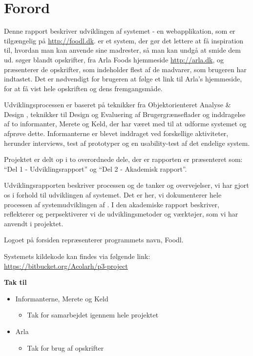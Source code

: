 \chapter*{Forord}
Denne rapport beskriver udviklingen af systemet \Foodl{} - en webapplikation, som er tilgængelig på \url{http://foodl.dk}. \Foodl{} er et system, der gør det lettere at få inspiration til, hvordan man kan anvende sine madrester, så man kan undgå at smide dem ud. \Foodl{} søger blandt opskrifter, fra Arla Foods hjemmeside \url{http://arla.dk}, og præsenterer de opskrifter, som indeholder flest af de madvarer, som brugeren har indtastet. Det er nødvendigt for brugeren at følge et link til Arla's hjemmeside, for at få vist hele opskriften og dens fremgangsmåde.

Udviklingsprocessen er baseret på teknikker fra Objektorienteret Analyse \& Design \cite{ooad}, teknikker til Design og Evaluering af Brugergrænseflader \cite{deb} og inddragelse af to informanter, Merete og Keld, der har været med til at udforme systemet og afprøve dette. Informanterne er blevet inddraget ved forskellige aktiviteter, herunder interviews, test af prototyper og en usability-test af det endelige system.

Projektet er delt op i to overordnede dele, der er rapporten er præsenteret som: ``Del 1 - Udviklingsrapport'' og ``Del 2 - Akademisk rapport''. 

Udviklingsrapporten beskriver processen og de tanker og overvejelser, vi har gjort os i forhold til udviklingen af systemet. Det er her, vi dokumenterer hele processen af systemudviklingen af \Foodl{}. I den akademiske rapport beskriver, reflekterer og perpsektiverer vi de udviklingsmetoder og værktøjer, som vi har anvendt i projektet.

Logoet på forsiden repræsenterer programmets navn, Foodl.

Systemets kildekode kan findes via følgende link: \url{https://bitbucket.org/Acolarh/p3-project}

\textbf{Tak til}
\begin{itemize}[noitemsep]
	\item Informanterne, Merete og Keld
	\begin{itemize}[noitemsep]
		\item Tak for samarbejdet igennem hele projektet
	\end{itemize}
	\item Arla
	\begin{itemize}[noitemsep]
		\item Tak for brug af opskrifter
	\end{itemize}
\end{itemize}